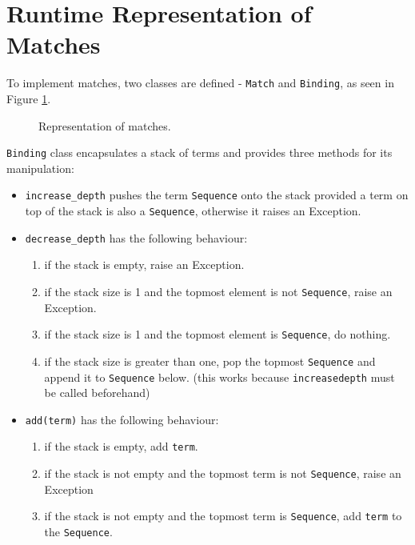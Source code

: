 \section{Runtime Representation of Matches}

To implement matches, two classes are defined - \texttt{Match} and \texttt{Binding}, as seen in Figure \ref{class-diagram-match-binding}.

\begin{figure}[H]
	\centering
	\caption{Representation of matches.}
\label{class-diagram-match-binding}
\end{figure}

\texttt{Binding} class encapsulates a stack of terms and provides three methods for its manipulation:

\begin{itemize}
\item 
\texttt{increase\_depth} pushes the term \texttt{Sequence} onto the stack provided a term on top of the stack is also a \texttt{Sequence}, otherwise it raises an Exception.

\item
\texttt{decrease\_depth} has the following behaviour:
	\begin{enumerate}
		\item
        if the stack is empty, raise an Exception.
		\item
		if the stack size is 1 and the topmost element is not \texttt{Sequence}, raise an Exception.
		\item
		if the stack size is 1 and the topmost element is \texttt{Sequence}, do nothing.
		\item
        if the stack size is greater than one, pop the topmost \texttt{Sequence} and append it to \texttt{Sequence} below. (this works because \texttt{increasedepth} must be called beforehand)
	\end{enumerate}

\item
\texttt{add(term)} has the following behaviour:
	\begin{enumerate}
		\item
         if the stack is empty, add \texttt{term}. 
		\item
         if the stack is not empty and the topmost term is not \texttt{Sequence}, raise an Exception
		\item
        if the stack is not empty and the topmost term is \texttt{Sequence}, add \texttt{term} to the \texttt{Sequence}.
	\end{enumerate}
\end{itemize}

